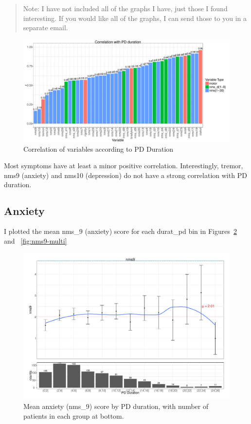 \documentclass[10pt]{article}
\begin{document}
\begin{multicols}{2}
\begin{quote}
  Note: I have not included all of the graphs I have, just those I found interesting. If you would
  like all of the graphs, I can send those to you in a separate email.
\end{quote}


\begin{figure}[t]
  \centering
  \includegraphics[width=0.9\linewidth]{pd-durat-cor.pdf}
  \caption{Correlation of variables according to PD Duration}
  \label{fig:longcorr}
\end{figure}

Most symptoms have at least a minor positive correlation. Interestingly, tremor, nms9 (anxiety)
and nms10 (depression) do not have a strong correlation with PD duration.

\subsection{Anxiety}
I plotted the mean nms\_9 (anxiety) score for each durat\_pd bin in
Figures~\ref{fig:nms9-long} and ~\ref{fig:nms9-multi}

\begin{figure}[p]
  \centering
  \includegraphics[width=0.8\linewidth]{nms9-durat-counts.pdf}
  \caption{Mean anxiety (nms\_9) score by PD duration, with number of patients in each group at
  bottom.}
  \label{fig:nms9-long}
\end{figure}


\end{multicols}
\end{document}
